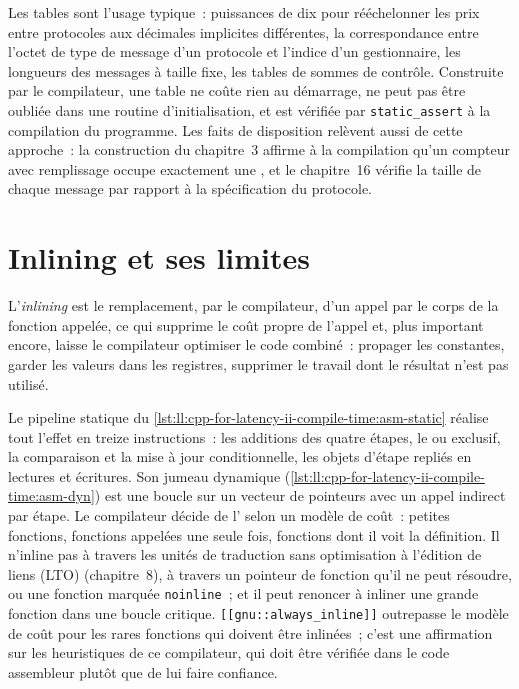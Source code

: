 Les tables sont l'usage typique~: puissances de dix pour rééchelonner les prix entre protocoles aux décimales implicites différentes, la
correspondance entre l'octet de type de message d'un protocole et l'indice d'un gestionnaire, les longueurs des messages à taille fixe, les tables de sommes de contrôle. Construite
par le compilateur, une table ne coûte rien au démarrage, ne peut pas être oubliée dans une routine d'initialisation, et est vérifiée par
\texttt{static\_assert} à la compilation du programme. Les faits de disposition relèvent aussi de cette approche~: la construction du chapitre~3 affirme
à la compilation qu'un compteur avec remplissage occupe exactement une , et le chapitre~16 vérifie la taille de chaque message
par rapport à la spécification du protocole.

\section{Inlining et ses limites}

\begin{definition}[Inlining]\label{def:ll:cpp-for-latency-ii-compile-time:inline}
L'\emph{inlining} est le remplacement, par le compilateur, d'un appel par le corps de la fonction appelée, ce qui supprime
le coût propre de l'appel et, plus important encore, laisse le compilateur optimiser le code combiné~: propager les constantes, garder les valeurs
dans les registres, supprimer le travail dont le résultat n'est pas utilisé.
\end{definition}

Le pipeline statique du \cref{lst:ll:cpp-for-latency-ii-compile-time:asm-static} réalise tout l'effet en treize
instructions~: les additions des quatre étapes, le ou exclusif, la comparaison et la mise à jour conditionnelle, les objets d'étape
repliés en lectures et écritures. Son jumeau dynamique (\cref{lst:ll:cpp-for-latency-ii-compile-time:asm-dyn}) est une boucle
sur un vecteur de pointeurs avec un appel indirect par étape. Le compilateur décide de l' selon un modèle de coût~: petites fonctions, fonctions
appelées une seule fois, fonctions dont il voit la définition. Il n'inline pas à travers les unités de traduction sans
optimisation à l'édition de liens (LTO) (chapitre~8), à travers un pointeur de fonction qu'il ne peut résoudre, ou une fonction marquée \texttt{noinline}~; et il peut
renoncer à inliner une grande fonction dans une boucle critique. \texttt{[[gnu::always\_inline]]} outrepasse le modèle de coût pour les rares
fonctions qui doivent être inlinées~; c'est une affirmation sur les heuristiques de ce compilateur, qui doit être vérifiée dans le
code assembleur plutôt que de lui faire confiance.

